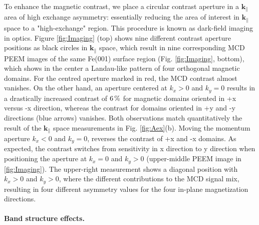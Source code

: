 \documentclass[prl,twocolumn,floatfix]{revtex4-2}
\renewcommand{\vec}[1]{\boldsymbol{#1}}
\begin{document}
To enhance the magnetic contrast, we place a circular contrast aperture in a $\vec{k}_{\parallel}$ area of high exchange asymmetry: essentially reducing the area of interest in $\vec{k}_{\parallel}$ space to a "high-exchange" region. This procedure is known as dark-field imaging in optics. 
Figure \ref{fig:Imaging} (top) shows nine different contrast aperture positions as black circles in $\vec{k}_{\parallel}$ space, which result in nine corresponding MCD PEEM images of the same Fe(001) surface region (Fig. \ref{fig:Imaging}, bottom), which shows in the center a Landau-like pattern of four orthogonal magnetic domains. For the centred aperture marked in red, the MCD contrast almost vanishes. On the other hand, an aperture centered at $k_x > 0$ and $k_y=0$ results in a drastically increased contrast of $\unit[6]{\%}$ for magnetic domains oriented in +x versus -x direction, whereas the contrast for domains oriented in +y and -y directions (blue arrows) vanishes. Both observations match quantitatively the result of the $\vec{k}_{\parallel}$ space measurements in Fig. \ref{fig:Aex}(b). Moving the momentum aperture $k_x < 0$ and $k_y=0$, reverses the contrast of +x and -x domains. 
As expected, the contrast switches from sensitivity in x direction to y direction when positioning the aperture at $k_x = 0$ and $k_y > 0$ (upper-middle PEEM image in \ref{fig:Imaging}). The upper-right measurement shows a diagonal position with $k_x > 0$ and $k_y > 0$, where the different contributions to the MCD signal mix, resulting in four different asymmetry values for the four in-plane magnetization directions. 


\paragraph{Band structure effects.}
\end{document}
